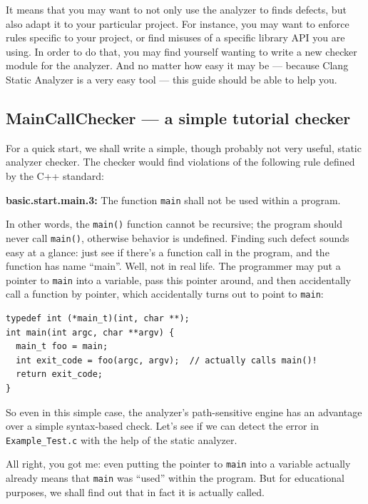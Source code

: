 \documentclass[a4paper,12pt]{article}
\newenvironment{nobr}{\begin{minipage}{\textwidth}\setlength\parskip{1em}
}{\end{minipage}\ignorespacesafterend}
\begin{document}
It means that you may want to not only use the analyzer to finds defects, but also adapt it to your particular project. For instance, you may want to enforce rules specific to your project, or find misuses of a specific library API you are using. In order to do that, you may find yourself wanting to write a new checker module for the analyzer. And no matter how easy it may be --- because Clang Static Analyzer is a very easy tool --- this guide should be able to help you.

\begin{nobr}
\subsection{MainCallChecker --- a simple tutorial checker}

For a quick start, we shall write a simple, though probably not very useful, static analyzer checker. The checker would find violations of the following rule defined by the C++ standard:

\qquad\textbf{basic.start.main.3:} The function \lstinline|main| shall not be used within a program.
\end{nobr}

In other words, the \lstinline|main()| function cannot be recursive; the program should never call \lstinline|main()|, otherwise behavior is undefined. Finding such defect sounds easy at a glance: just see if there's a function call in the program, and the function has name ``main''. Well, not in real life. The programmer may put a pointer to \lstinline|main| into a variable, pass this pointer around, and then accidentally call a function by pointer, which accidentally turns out to point to \lstinline|main|:

\begin{nobr}
\begin{lstlisting}[style=cplusplus,title=\lstinline|Example_Test.c|,numbers=none]
typedef int (*main_t)(int, char **);
int main(int argc, char **argv) {
  main_t foo = main;
  int exit_code = foo(argc, argv);  // actually calls main()!
  return exit_code;
}
\end{lstlisting}
\end{nobr}

So even in this simple case, the analyzer's path-sensitive engine has an advantage over a simple syntax-based check. Let's see if we can detect the error in \lstinline|Example_Test.c| with the help of the static analyzer.

All right, you got me: even putting the pointer to \lstinline|main| into a variable actually already means that \lstinline|main| was ``used'' within the program. But for educational purposes, we shall find out that in fact it is actually called.
\end{document}

